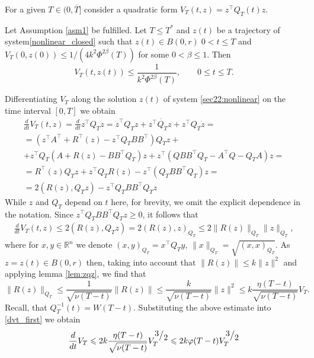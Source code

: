 \documentclass[../main.tex]{subfiles}
\begin{document}
For a given $T\in (0, \overline{T}]$ consider a quadratic form $V_T(t,z)=z^{\top}Q_T(t)z$.  
\begin{lemma}\label{lem:vest}
 Let Assumption \ref{asm1} be fulfilled. Let $T\leqslant T^*$ and $z(t)$ be a trajectory of system\eqref{nonlinear_closed} such that   $z(t)  \in B(0,r)\;0<t \leqslant T$ and $V_T(0,z(0))\leqslant 1/(4k^2\Phi^{2\beta}(T))$ for some $0<\beta \leqslant 1$. Then 
 $$V_T(t,z(t)) \leqslant \frac{1}{k^2\Phi^{2\beta}(T)}, \qquad 0 \leqslant t \leqslant T. $$
\end{lemma}
\doc
Differentiating $V_T$ along the solution $z(t)$ of  system \eqref{sec22:nonlinear}  on the time interval $[0, T]$ we obtain
\begin{gather*}
    \frac{d}{dt}V_T(t,z) = \frac{d}{dt}z^{\top}Q_Tz = \dot{z}^{\top} Q_T z + z^{\top} \dot{Q_T} z + z^{\top} Q_T \dot{z} = \\
    =\left(z^{\top} A^{\top} + R^{\top}(z)- z^{\top} Q_T B B^{\top}\right) Q_T z + \\ +
		z^{\top} Q_T \left(A +R(z) - B B^{\top} Q_T\right)z + z^{\top} \left(Q B B^{\top} Q_T - A^{\top}Q - Q_T A \right) z = \\
    = R^{\top}(z)Q_T z + z^{\top} Q_T R(z) - z^{\top} (Q_T B B^{\top} Q_T) z = \\
    = 2 \left( R(z), Q_Tz \right) - z^{\top} Q_T B B^{\top} Q_T z 
\end{gather*}
While $z$ and $Q_T$  depend on $t$ here, for brevity, we omit the explicit dependence in the notation. Since $z^{\top} Q_T B B^{\top} Q_T z\geqslant 0$, it follows that
\begin{gather}\label{dvt_first}
    \frac{d}{dt}V_T(t,z) \leqslant 2 \left( R(z), Q_T z\right)=2(R(z),z)_{Q_T} \leqslant 2 \| R(z) \|_{Q_T} \| z \|_{Q_T},
\end{gather}
where for $x,y\in \mathbb R^n$ we denote $(x,y)_{Q_T}=x^\top Q_Ty$,  $\| x \|_{Q_T} =\sqrt{(x,x)_{Q_T}}$. As $z = z(t) \in B(0,r)$ then, taking into account that $\|R(z)\| \leqslant k\|z\|^2$  and applying lemma \ref{lem:zqz}, we find that 
\begin{equation}\label{rqr_est}
     \| R(z) \|_{Q_T} \leqslant \frac{1}{\sqrt{\nu(T - t)}} \|R(z)\| \leqslant \frac{k}{\sqrt{\nu(T - t)}}\|z\|^2 \leqslant k \frac{\eta(T-t)}{\sqrt{\nu(T-t)}}V_T.
\end{equation}
Recall, that  $ Q_T^{-1}(t) = W(T-t) $.
Substituting the  above estimate into \eqref{dvt_first} we obtain
\begin{equation}\label{dvt}
    \frac{d}{dt}V_T \leqslant 2 k \frac{\eta(T-t)}{\sqrt{\nu(T-t)}}V_T^{\frc{3}{2}} \leqslant 2k \varphi(T-t) V_T^{\frc{3}{2}}
\end{equation}
\end{document}
